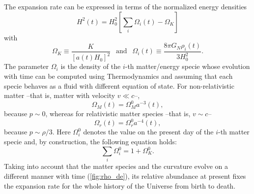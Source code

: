 The expansion rate can be expressed in terms of the normalized energy densities
\begin{equation}
H^2(t) = H_0^2\left[\sum_i\Omega_i(t)-\Omega_K\right]
\label{eq:flrw}
\end{equation}
with
\begin{equation}
\Omega_K\equiv\frac{K}{[a(t)H_0]^2}\ \ \mbox{ and }\ \ \Omega_i(t)\equiv \frac{8\pi G_N\rho_i(t)}{3H_0^2}.
\end{equation}
The parameter $\Omega_i$ is the density of the $i$-th matter/energy specie whose evolution with time can be computed using Thermodynamics and assuming that each specie behaves as a fluid with different equation of state. For non-relativistic matter --that is, matter with velocity $v\ll c$--, 
\begin{equation}
\Omega_M(t) = \Omega_M^0a^{-3}(t),
\end{equation}
because $p\sim 0$, whereas for relativistic matter species --that is, $v\sim c$--
\begin{equation}
\Omega_r(t) = \Omega_r^0 a^{-4}(t),
\end{equation}
because $p\sim\rho/3$. Here $\Omega_i^0$ denotes the value on the present day of the $i$-th matter specie and, by construction, the following equation holds:
\begin{equation}
\sum_i\Omega_i^0=1+\Omega_K^0.
\label{eq:conservationenergy}
\end{equation}
Taking into account that the matter species and the curvature evolve on a different manner with time (\autoref{fig:rho_de}), its relative abundance at present fixes the expansion rate for the whole history of the Universe from birth to death.
